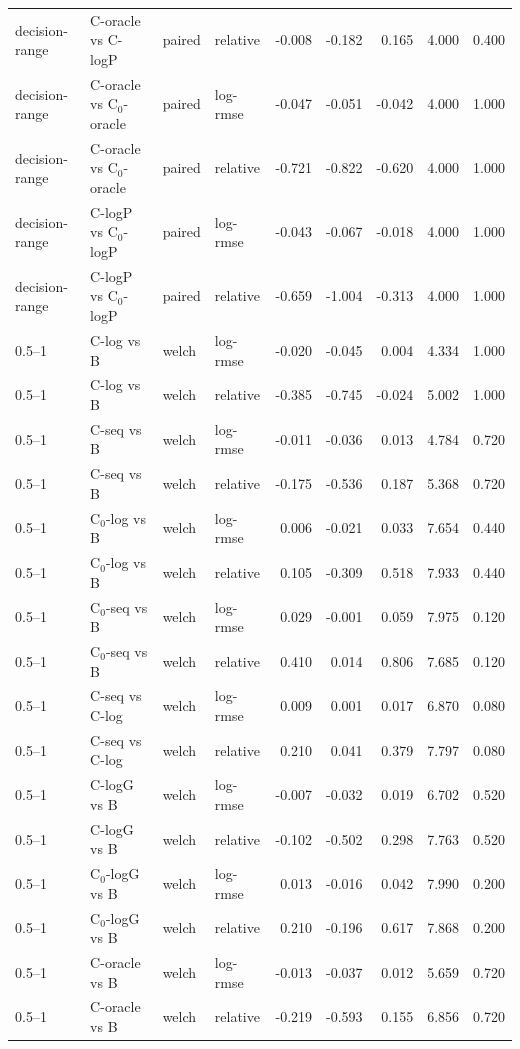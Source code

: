 \begin{longtable}{llllrrrrr}
decision-range & C-oracle vs C-logP & paired & relative & -0.008 & -0.182 & 0.165 & 4.000 & 0.400 \\
decision-range & C-oracle vs C$_0$-oracle & paired & log-rmse & -0.047 & -0.051 & -0.042 & 4.000 & 1.000 \\
decision-range & C-oracle vs C$_0$-oracle & paired & relative & -0.721 & -0.822 & -0.620 & 4.000 & 1.000 \\
decision-range & C-logP vs C$_0$-logP & paired & log-rmse & -0.043 & -0.067 & -0.018 & 4.000 & 1.000 \\
decision-range & C-logP vs C$_0$-logP & paired & relative & -0.659 & -1.004 & -0.313 & 4.000 & 1.000 \\
0.5–1 & C-log vs B & welch & log-rmse & -0.020 & -0.045 & 0.004 & 4.334 & 1.000 \\
0.5–1 & C-log vs B & welch & relative & -0.385 & -0.745 & -0.024 & 5.002 & 1.000 \\
0.5–1 & C-seq vs B & welch & log-rmse & -0.011 & -0.036 & 0.013 & 4.784 & 0.720 \\
0.5–1 & C-seq vs B & welch & relative & -0.175 & -0.536 & 0.187 & 5.368 & 0.720 \\
0.5–1 & C$_0$-log vs B & welch & log-rmse & 0.006 & -0.021 & 0.033 & 7.654 & 0.440 \\
0.5–1 & C$_0$-log vs B & welch & relative & 0.105 & -0.309 & 0.518 & 7.933 & 0.440 \\
0.5–1 & C$_0$-seq vs B & welch & log-rmse & 0.029 & -0.001 & 0.059 & 7.975 & 0.120 \\
0.5–1 & C$_0$-seq vs B & welch & relative & 0.410 & 0.014 & 0.806 & 7.685 & 0.120 \\
0.5–1 & C-seq vs C-log & welch & log-rmse & 0.009 & 0.001 & 0.017 & 6.870 & 0.080 \\
0.5–1 & C-seq vs C-log & welch & relative & 0.210 & 0.041 & 0.379 & 7.797 & 0.080 \\
0.5–1 & C-logG vs B & welch & log-rmse & -0.007 & -0.032 & 0.019 & 6.702 & 0.520 \\
0.5–1 & C-logG vs B & welch & relative & -0.102 & -0.502 & 0.298 & 7.763 & 0.520 \\
0.5–1 & C$_0$-logG vs B & welch & log-rmse & 0.013 & -0.016 & 0.042 & 7.990 & 0.200 \\
0.5–1 & C$_0$-logG vs B & welch & relative & 0.210 & -0.196 & 0.617 & 7.868 & 0.200 \\
0.5–1 & C-oracle vs B & welch & log-rmse & -0.013 & -0.037 & 0.012 & 5.659 & 0.720 \\
0.5–1 & C-oracle vs B & welch & relative & -0.219 & -0.593 & 0.155 & 6.856 & 0.720 \\

\end{longtable}
